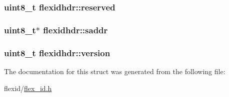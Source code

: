 \subsubsection[{\texorpdfstring{reserved}{reserved}}]{\setlength{\rightskip}{0pt plus 5cm}uint8\+\_\+t flexidhdr\+::reserved}\hypertarget{structflexidhdr_a79659668b865b2f14a1e5ac5e6ee63d5}{}\label{structflexidhdr_a79659668b865b2f14a1e5ac5e6ee63d5}
\subsubsection[{\texorpdfstring{saddr}{saddr}}]{\setlength{\rightskip}{0pt plus 5cm}uint8\+\_\+t$\ast$ flexidhdr\+::saddr}\hypertarget{structflexidhdr_ae5f70fa4b298c9ff8fd8ac56d94f52ab}{}\label{structflexidhdr_ae5f70fa4b298c9ff8fd8ac56d94f52ab}
\subsubsection[{\texorpdfstring{version}{version}}]{\setlength{\rightskip}{0pt plus 5cm}uint8\+\_\+t flexidhdr\+::version}\hypertarget{structflexidhdr_a040648453cb452e600995d86a1432264}{}\label{structflexidhdr_a040648453cb452e600995d86a1432264}


The documentation for this struct was generated from the following file\+:\begin{DoxyCompactItemize}
\item 
flexid/\hyperlink{flexid_2flex__id_8h}{flex\+\_\+id.\+h}\end{DoxyCompactItemize}
